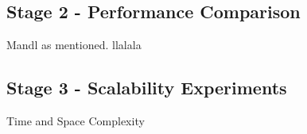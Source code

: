 \subsection{Stage 2 - Performance Comparison}

Mandl as mentioned. llalala

\subsection{Stage 3 -  Scalability Experiments}
Time and Space Complexity
